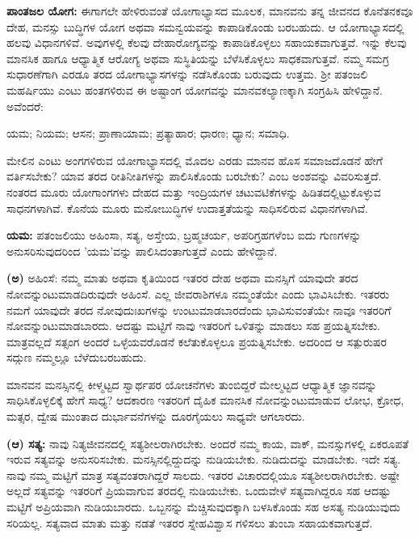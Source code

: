 \textbf{ಪಾಂತಜಲ ಯೋಗ:} ಈಗಾಗಲೇ ಹೇಳಿರುವಂತೆ ಯೋಗಾಭ್ಯಾಸದ ಮೂಲಕ, ಮಾನವನು ತನ್ನ ಜೀವನದ ಕೊನೆತನಕವೂ ದೇಹ, ಮನಸ್ಸು ಬುದ್ಧಿಗಳ ಯೋಗ ಅಥವಾ ಸಮನ್ವಯವನ್ನು ಕಾಪಾಡಿಕೊಂಡು ಬರಬಹುದು. ಆ ಯೋಗಾಭ್ಯಾಸದಲ್ಲಿ ಹಲವು ವಿಧಾನಗಳಿವೆ. ಅವುಗಳಲ್ಲಿ ಕೆಲವು ದೇಹಾರೋಗ್ಯವನ್ನು ಕಾಪಾಡಿಕೊಳ್ಳಲು ಸಹಾಯಕವಾಗುತ್ತವೆ. ಇನ್ನು ಕೆಲವು ಮಾನಸಿಕ ಹಾಗೂ ಆಧ್ಯಾತ್ಮಿಕ ಆರೋಗ್ಯ ಅಥವಾ ಸುಸ್ಥಿತಿಯನ್ನು ಬೆಳೆಸಿಕೊಳ್ಳಲು ಸಾಧಕವಾಗುತ್ತವೆ. ನಮ್ಮ ಸಮಗ್ರ ಸುಧಾರಣೆಗಾಗಿ ಎರಡೂ ತರದ ಯೋಗಾಭ್ಯಾಸಗಳನ್ನು ನಡೆಸಿಕೊಂಡು ಬರುವುದು ಉತ್ತಮ. ಶ‍್ರೀ ಪತಂಜಲಿ ಮಹರ್ಷಿಯು ಎಂಟು ಹಂತಗಳಿರುವ ಈ ಅಷ್ಟಾಂಗ ಯೋಗವನ್ನು ಮಾನವಕಲ್ಯಾಣಕ್ಕಾಗಿ ಸಂಗ್ರಹಿಸಿ ಹೇಳಿದ್ದಾನೆ. ಅವೆಂದರೆ:

 ಯಮ;  ನಿಯಮ;  ಆಸನ;  ಪ್ರಾಣಾಯಾಮ;  ಪ್ರತ್ಯಾಹಾರ;  ಧಾರಣ;  ಧ್ಯಾನ;  ಸಮಾಧಿ.

ಮೇಲಿನ ಎಂಟು ಅಂಗಗಳಿರುವ ಯೋಗಾಭ್ಯಾಸದಲ್ಲಿ ಮೊದಲ ಎರಡು ಮಾನವ ಹೊಸ ಸಮಾಜದೊಡನೆ ಹೇಗೆ ವರ್ತಿಸಬೇಕು? ಯಾವ ತರದ ರೀತಿನೀತಿಗಳನ್ನು ಪಾಲಿಸಿಕೊಂಡು ಬರಬೇಕು? ಎಂಬ ಅಂಶವನ್ನು ವಿವರಿಸುತ್ತದೆ. ನಂತರದ ಮೂರು ಯೋಗಾಂಗಗಳು ದೇಹದ ಮತ್ತು ಇಂದ್ರಿಯಗಳ ಚಟುವಟಿಕೆಗಳನ್ನು ಹಿಡಿತದಲ್ಲಿಟ್ಟುಕೊಳ್ಳುವ ಸಾಧನಗಳಾಗಿವೆ. ಕೊನೆಯ ಮೂರು ಮನೋಬುದ್ಧಿಗಳ ಉದಾತ್ತತೆಯನ್ನು ಸಾಧಿಸಲಿರುವ ವಿಧಾನಗಳಾಗಿವೆ.

\textbf{  ಯಮ:} ಪತಂಜಲಿಯು ಅಹಿಂಸಾ, ಸತ್ಯ, ಅಸ್ತೇಯ, ಬ್ರಹ್ಮಚರ್ಯ, ಅಪರಿಗ್ರಹಗಳೆಂಬ ಐದು ಗುಣಗಳನ್ನು ಅನುಸರಿಸುವುದರಿಂದ 'ಯಮ'ವನ್ನು ಪಾಲಿಸಿದಂತಾಗುತ್ತದೆ ಎಂದು ಹೇಳಿದ್ದಾನೆ.

\textbf{(ಅ)} ಅಹಿಂಸೆ: ನಮ್ಮ ಮಾತು ಅಥವಾ ಕೃತಿಯಿಂದ ಇತರರ ದೇಹ ಅಥವಾ ಮನಸ್ಸಿಗೆ ಯಾವುದೇ ತರದ ನೋವನ್ನುಂಟುಮಾಡದಿರುವುದೇ ಅಹಿಂಸೆ. ಎಲ್ಲ ಜೀವರಾಶಿಗಳೂ ನಮ್ಮಂತೆಯೇ ಎಂದು ಭಾವಿಸಿಬೇಕು. ಇತರರು ನಮಗೆ ಯಾವುದೇ ತರದ ನೋವುದುಃಖಗಳನ್ನು ಉಂಟುಮಾಡಬಾರದೆಂದು ಭಾವಿಸುವಂತೆಯೇ ನಾವೂ ಇತರರಿಗೆ ನೋವನ್ನುಂಟುಮಾಡಬಾರದು. ಆದಷ್ಟು ಮಟ್ಟಿಗೆ ನಾವು ಇತರರಿಗೆ ಒಳಿತನ್ನು ಮಾಡಲು ಸಹ ಪ್ರಯತ್ನಿಸಬೇಕು. ಮಾತ್ರವಲ್ಲದೆ ಸತ್ಸಂಗ ಅಂದರೆ ಒಳ್ಳೆಯವರೊಡನೆ ಕಲೆತುಕೊಳ್ಳಲೂ ಪ್ರಯತ್ನಿಸಬೇಕು. ಅದರಿಂದ ಆ ಸತ್ಪುರುಷರ ಸದ್ಗುಣ ನಮ್ಮಲ್ಲೂ ಬೆಳೆದುಬರಬಹುದು.

ಮಾನವನ ಮನಸ್ಸಿನಲ್ಲಿ ಕೀಳ್ಮಟ್ಟದ ಸ್ವಾರ್ಥಪರ ಯೋಚನೆಗಳು ತುಂಬಿದ್ದರೆ ಮೇಲ್ಮಟ್ಟದ ಆಧ್ಯಾತ್ಮಿಕ ಜ್ಞಾನವನ್ನು ಸಾಧಿಸಿಕೊಳ್ಳಲಿಕ್ಕೆ ಹೇಗೆ ಸಾಧ್ಯ? ಆದಕಾರಣ ಇತರರಿಗೆ ದೈಹಿಕ ಮಾನಸಿಕ ನೋವನ್ನುಂಟುಮಾಡುವ ಲೋಭ, ಕ್ರೋಧ, ಮತ್ಸರ, ದ್ವೇಷ ಮುಂತಾದ ದುರ್ಭಾವನೆಗಳನ್ನು ದೂರಗೈಯಲು ಸಾಧ್ಯವೇ ಆಗಲಾರದು.

\textbf{(ಆ) ಸತ್ಯ:} ನಾವು ನಿತ್ಯಜೀವನದಲ್ಲಿ ಸತ್ಯಶೀಲರಾಗಿರಬೇಕು. ಅಂದರೆ ನಮ್ಮ ಕಾಯ, ವಾಕ್, ಮನಸ್ಸುಗಳಲ್ಲಿ ಏಕರೂಪತೆ ಇರುವ ಸತ್ಯವನ್ನು ಅನುಸರಿಸಬೇಕು. ಮನಸ್ಸಿನಲ್ಲಿದ್ದುದನ್ನು ನುಡಿಯಬೇಕು. ನುಡಿದುದನ್ನು ಮಾಡಬೇಕು. ಇದೇ ಸತ್ಯ. ನಾವು ನಮ್ಮ ಮಟ್ಟಿಗೆ ಮಾತ್ರ ಸತ್ಯವಂತರಾಗಿದ್ದರೆ ಸಾಲದು. ಇತರರ ವಿಚಾರದಲ್ಲಿಯೂ ಸತ್ಯಶೀಲರಾಗಿರಬೇಕು. ಅಷ್ಟೇ ಅಲ್ಲದೆ ಸತ್ಯವನ್ನು ಇತರರಿಗೆ ಪ್ರಿಯವಾಗುವ ತರದಲ್ಲಿ ನುಡಿಯಬೇಕು. ಒಂದುವೇಳೆ ಸತ್ಯವಾಗಿದ್ದರೂ ಸಹ ಆದಷ್ಟು ಮಟ್ಟಿಗೆ ಅಪ್ರಿಯವಾಗಿ ನುಡಿಯಬಾರದು. ಒಬ್ಬನನ್ನು ಮೆಚ್ಚಿಸುವುದಕ್ಕಾಗಿ ಬಳಸಿಕೊಂಡು ಸಹ ಅಸತ್ಯ ನುಡಿಯುವುದು ಸರಿಯಲ್ಲ. ಸತ್ಯವಾದ ಮಾತು ಮತ್ತು ನಡತೆ ಇತರರ ಸ್ನೇಹವಿಶ್ವಾಸ ಗಳಿಸಲು ತುಂಬಾ ಸಹಾಯಕವಾಗುತ್ತದೆ.

